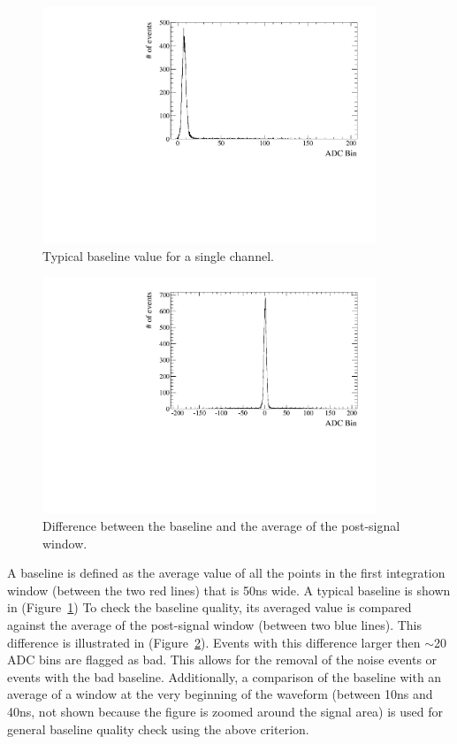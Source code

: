 \documentclass[preprint,12pt]{elsarticle}
\begin{document}
\begin{figure}[ht]
\centering
\includegraphics[width=100mm]{baselineitself.pdf}
\caption{Typical baseline value for a single channel.} \label{typicalbaseline}
\end{figure}

\begin{figure}[ht]
\centering
\includegraphics[width=100mm]{baselinedifference.pdf}
\caption{Difference between the baseline and the average of the post-signal window.} \label{baselinedifference}
\end{figure}


A baseline is defined as the average value of all the points in the first integration window (between the two red lines) that is 50ns wide. A typical baseline is shown in (Figure~\ref{typicalbaseline}) To check the baseline quality, its averaged value is compared against the average of the post-signal window (between two blue lines). This difference is illustrated in (Figure~\ref{baselinedifference}). Events with this difference larger then $\sim$20 ADC bins are flagged as bad. This allows for the removal of the noise events or events with the bad baseline. Additionally, a comparison of the baseline with an average of a window at the very beginning of the waveform (between 10ns and 40ns, not shown because the figure is zoomed around the signal area) is used for general baseline quality check using the above criterion.
\end{document}
